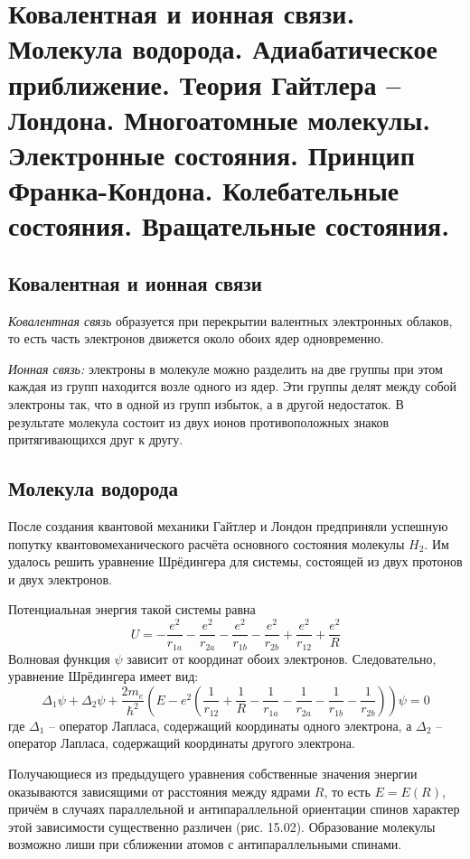 \chapter{Ковалентная и ионная связи. Молекула водорода. Адиабатическое 
приближение. Теория Гайтлера -- Лондона. Многоатомные молекулы. 
Электронные состояния. Принцип Франка-Кондона. Колебательные состояния. 
Вращательные состояния.}

\section{Ковалентная и ионная связи}
\emph{Ковалентная связь} образуется при перекрытии валентных электронных 
облаков, то есть часть электронов движется около обоих ядер одновременно.

\emph{Ионная связь:} электроны в молекуле можно разделить на две группы 
при этом каждая из групп находится возле одного из ядер. Эти группы делят 
между собой электроны так, что в одной из групп избыток, а в другой 
недостаток. В результате молекула состоит из двух ионов противоположных 
знаков притягивающихся друг к другу.

\section{Молекула водорода}
После создания квантовой механики Гайтлер и Лондон предприняли успешную 
попутку квантовомеханического расчёта основного состояния молекулы 
\( H_2 \). Им удалось решить уравнение Шрёдингера для системы, состоящей 
из двух протонов и двух электронов.


Потенциальная энергия такой системы равна
\[ 
	U = -\frac{e^2}{r_{1a}} - \frac{e^2}{r_{2a}} - \frac{e^2}{r_{1b}} -
	\frac{e^2}{r_{2b}} + \frac{e^2}{r_{12}} + \frac{e^2}{R} 
\]
Волновая функция \( \psi \) зависит от координат обоих электронов. 
Следовательно, уравнение Шрёдингера имеет вид:
\[ 
	\Delta_1\psi + \Delta_2\psi + \frac{2m_e}{\hbar^2}
	\left(E - e^2\left( \frac{1}{r_{12}} + \frac{1}{R} -
	\frac{1}{r_{1a}} - \frac{1}{r_{2a}} - \frac{1}{r_{1b}} -
	\frac{1}{r_{2b}}\right) \right)\psi = 0
\]
где \( \Delta_1 \) -- оператор Лапласа, содержащий координаты 
одного электрона, а \( \Delta_2 \) -- оператор Лапласа, содержащий 
координаты другого электрона.

Получающиеся из предыдущего уравнения собственные значения 
энергии оказываются зависящими от расстояния между ядрами \( R \), 
то есть \( E = E(R) \), причём в случаях параллельной и 
антипараллельной ориентации спинов характер этой зависимости существенно 
различен (рис. 15.02). Образование молекулы возможно лиши при сближении 
атомов с антипараллельными спинами.

